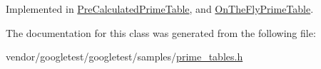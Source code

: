 Implemented in \hyperlink{class_pre_calculated_prime_table_a8a9ab7f99b09e5e987933c260e7304cf}{Pre\+Calculated\+Prime\+Table}, and \hyperlink{class_on_the_fly_prime_table_a1d49b78f79e018441289e79d75680067}{On\+The\+Fly\+Prime\+Table}.



The documentation for this class was generated from the following file\+:\begin{DoxyCompactItemize}
\item 
vendor/googletest/googletest/samples/\hyperlink{prime__tables_8h}{prime\+\_\+tables.\+h}\end{DoxyCompactItemize}
